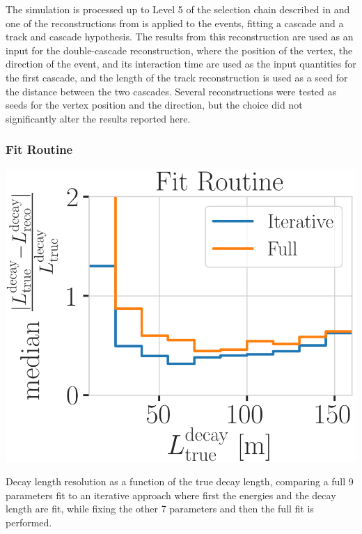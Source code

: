 The simulation is processed up to Level 5 of the selection chain described in  and one of the reconstructions from  is applied to the events, fitting a cascade and a track and cascade hypothesis. The results from this reconstruction are used as an input for the double-cascade reconstruction, where the position of the vertex, the direction of the event, and its interaction time are used as the input quantities for the first cascade, and the length of the track reconstruction is used as a seed for the distance between the two cascades. Several reconstructions were tested as seeds for the vertex position and the direction, but the choice did not significantly alter the results reported here.


\subsubsection{Fit Routine}

\begin{marginfigure}
	\centering
    \includegraphics{figures/results/190605_reco_optimization/fit_routine_splitting_median_decay_length_resolution_Good + L7 + reco E1,E2 above 3_fix_y_new.png}
    \caption[Decay length resolution to optimize fit routine]{Decay length resolution as a function of the true decay length, comparing a full 9 parameters fit to an iterative approach where first the energies and the decay length are fit, while fixing the other 7 parameters and then the full fit is performed.}
\end{marginfigure}

